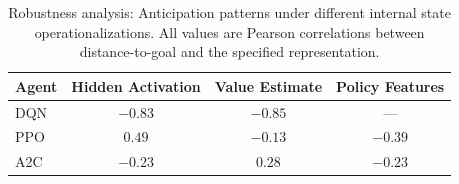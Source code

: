 \begin{table}[t]
\caption{Robustness analysis: Anticipation patterns under different internal state operationalizations. All values are Pearson correlations between distance-to-goal and the specified representation.}
\label{tab:robustness}
\centering
\small
\begin{tabular}{lccc}
\toprule
Agent & Hidden Activation & Value Estimate & Policy Features \\
\midrule
DQN & $-0.83$ & $-0.85$ & --- \\
PPO & $0.49$ & $-0.13$ & $-0.39$ \\
A2C & $-0.23$ & $0.28$ & $-0.23$ \\
\bottomrule
\end{tabular}
\end{table}
